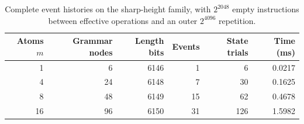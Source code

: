 \begin{table}[htbp]
\centering\small
\begin{tabular}{rrrrrr}
\toprule
Atoms $m$ & Grammar nodes & Length bits & Events & State trials & Time (ms)\\
\midrule
1 & 6 & 6146 & 1 & 6 & 0.0217\\
4 & 24 & 6148 & 7 & 30 & 0.1625\\
8 & 48 & 6149 & 15 & 62 & 0.4678\\
16 & 96 & 6150 & 31 & 126 & 1.5982\\
\bottomrule
\end{tabular}
\caption{Complete event histories on the sharp-height family, with $2^{2048}$ empty instructions between effective operations and an outer $2^{4096}$ repetition.}
\label{tab:history}
\end{table}
